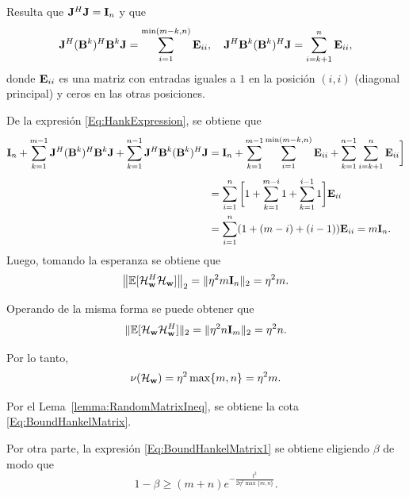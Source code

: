 Resulta que $\mathbf{J}^H\mathbf{J} = \mathbf{I}_n$ y que 
\[\mathbf{J}^H(\mathbf{B}^k)^H\mathbf{B}^k\mathbf{J} = \sum_{i=1}^{\min(m-k,n)}\mathbf{E}_{ii},\quad \mathbf{J}^H\mathbf{B}^k(\mathbf{B}^k)^H\mathbf{J} = \sum_{i=k+1}^{n}\mathbf{E}_{ii},\]
donde $\mathbf{E}_{ii}$ es una matriz con entradas iguales a  $1$ en la posición $(i,i)$ (diagonal principal) y ceros en las otras posiciones.

De la expresión \eqref{Eq:HankExpression}, se obtiene que
\[\begin{aligned}
	\mathbf{I}_n + \sum_{k=1}^{m-1}\mathbf{J}^H(\mathbf{B}^k)^H\mathbf{B}^k\mathbf{J} + \sum_{k=1}^{n-1}\mathbf{J}^H\mathbf{B}^k(\mathbf{B}^k)^H\mathbf{J} & = \mathbf{I}_n + \sum_{k=1}^{m-1}\sum_{i=1}^{\min(m-k,n)}\mathbf{E}_{ii} + \sum_{k=1}^{n-1}\sum_{i=k+1}^{n}\mathbf{E}_{ii}\bigg]\\[0.3em]
	& = \sum_{i=1}^n\bigg[1 + \sum_{k=1}^{m-i}1+\sum_{k=1}^{i-1}1\bigg]\mathbf{E}_{ii} \\
	& = \sum_{i=1}^n(1+(m-i)+(i-1))\mathbf{E}_{ii} = m\mathbf{I}_n.
\end{aligned}\]	
Luego, tomando la esperanza se obtiene que 
\[\big\|\mathbb{E}[\mathcal{H}_{\mathbf{w}}^H\mathcal{H}_{\mathbf{w}}]\big\|_2 = \|\eta^2m\mathbf{I}_n\|_2 = \eta^2m.\]

Operando de la misma forma se puede obtener que 
\[\|\mathbb{E}[\mathcal{H}_{\mathbf{w}}\mathcal{H}_{\mathbf{w}}^H]\|_2 = \|\eta^2n\mathbf{I}_m\|_2 = \eta^2n.\]

Por lo tanto, 
\[\nu(\mathcal{H}_{\mathbf{w}}) = \eta^2\max\{m,n\} = \eta^2m.\]

Por el Lema~\ref{lemma:RandomMatrixIneq}, se obtiene la cota \eqref{Eq:BoundHankelMatrix}. 

Por otra parte, la expresión \eqref{Eq:BoundHankelMatrix1} se obtiene eligiendo $\beta$ de modo que
\[1-\beta \ge (m+n)e^{-\frac{t^2}{2\eta^2\max\{m,n\}}}. \]







